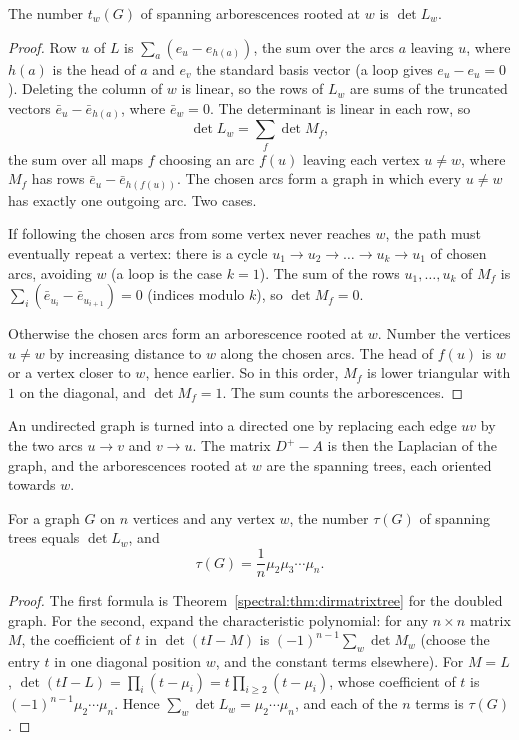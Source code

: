 \begin{theorem}\label{spectral:thm:dirmatrixtree}
The number $t_w(G)$ of spanning arborescences rooted at $w$ is $\det L_w$.
\end{theorem}
\begin{proof}
Row $u$ of $L$ is $\sum_{a}(e_u-e_{h(a)})$, the sum over the arcs $a$ leaving $u$, where $h(a)$ is the head of $a$ and $e_v$ the standard basis vector (a loop gives
$e_u-e_u=0$). Deleting the column of $w$ is linear, so the rows of $L_w$ are sums of the truncated vectors $\bar e_u-\bar e_{h(a)}$, where $\bar e_w=0$. The determinant is linear in each
row, so
\[
\det L_w=\sum_f\det M_f,
\]
the sum over all maps $f$ choosing an arc $f(u)$ leaving each vertex $u\ne w$, where $M_f$ has rows $\bar e_u-\bar e_{h(f(u))}$. The chosen arcs form a graph in which every $u\ne w$ has exactly one
outgoing arc. Two cases.

If following the chosen arcs from some vertex never reaches $w$, the path must eventually repeat a vertex: there is a cycle $u_1\to u_2\to\dots\to u_k\to u_1$ of chosen arcs, avoiding $w$ (a loop
is the case $k=1$). The sum of the rows $u_1,\dots,u_k$ of $M_f$ is $\sum_i(\bar e_{u_i}-\bar e_{u_{i+1}})=0$ (indices modulo $k$), so $\det M_f=0$.

Otherwise the chosen arcs form an arborescence rooted at $w$. Number the vertices $u\ne w$ by increasing distance to $w$ along the chosen arcs. The head of $f(u)$ is
$w$ or a vertex closer to $w$, hence earlier. So in this order, $M_f$ is lower triangular with $1$ on the diagonal, and $\det M_f=1$. The sum counts the arborescences.
\end{proof}

An undirected graph is turned into a directed one by replacing each edge $uv$ by the two arcs $u\to v$ and $v\to u$. The matrix $D^+-A$ is then the Laplacian of
the graph, and the arborescences rooted at $w$ are the spanning trees, each oriented towards $w$.

\begin{corollary}[Kirchhoff, 1847]\label{spectral:cor:kirchhoff}
For a graph $G$ on $n$ vertices and any vertex $w$, the number $\tau(G)$ of spanning trees equals $\det L_w$, and
\[
\tau(G)=\frac1n\mu_2\mu_3\cdots\mu_n.
\]
\end{corollary}
\begin{proof}
The first formula is Theorem~\ref{spectral:thm:dirmatrixtree} for the doubled graph. For the second, expand the characteristic polynomial: for any $n\times n$ matrix $M$, the coefficient of
$t$ in $\det(tI-M)$ is $(-1)^{n-1}\sum_w\det M_w$ (choose the entry $t$ in one diagonal position $w$, and the constant terms elsewhere). For $M=L$, $\det(tI-L)=\prod_i(t-\mu_i)=t\prod_{i\ge2}(t-\mu_i)$, whose
coefficient of $t$ is $(-1)^{n-1}\mu_2\cdots\mu_n$. Hence $\sum_w\det L_w=\mu_2\cdots\mu_n$, and each of the $n$ terms is $\tau(G)$.
\end{proof}

